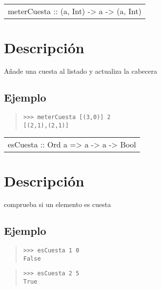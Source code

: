 \begin{haddockdesc}
\item[\begin{tabular}{@{}l}
meterCuesta :: {\char 91}(a, Int){\char 93} -> a -> {\char 91}(a, Int){\char 93}
\end{tabular}]
{\haddockbegindoc
\section*{Descripción}
Añade una cuesta al listado y actualiza la cabecera\par
\subsection*{Ejemplo}
\begin{quote}
{\haddockverb\begin{verbatim}
>>> meterCuesta [(3,0)] 2
[(2,1),(2,1)]

\end{verbatim}}
\end{quote}}
\end{haddockdesc}
\begin{haddockdesc}
\item[\begin{tabular}{@{}l}
esCuesta :: Ord a => a -> a -> Bool
\end{tabular}]
{\haddockbegindoc
\section*{Descripción}
comprueba si un elemento es cuesta\par
\subsection*{Ejemplo}
\begin{quote}
{\haddockverb\begin{verbatim}
>>> esCuesta 1 0
False

\end{verbatim}}
\end{quote}
\begin{quote}
{\haddockverb\begin{verbatim}
>>> esCuesta 2 5
True

\end{verbatim}}
\end{quote}}
\end{haddockdesc}